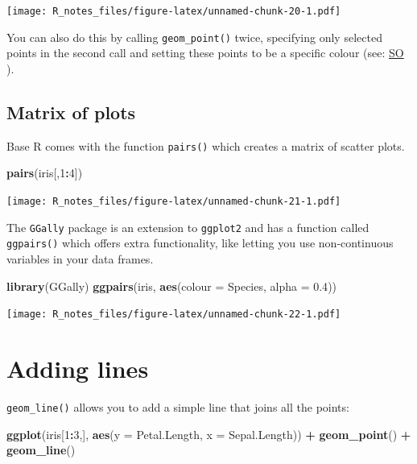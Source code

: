 \documentclass[]{book}
\newenvironment{Shaded}{\begin{snugshade}}{\end{snugshade}}
\newcommand{\KeywordTok}[1]{\textcolor[rgb]{0.13,0.29,0.53}{\textbf{#1}}}
\newcommand{\DataTypeTok}[1]{\textcolor[rgb]{0.13,0.29,0.53}{#1}}
\newcommand{\DecValTok}[1]{\textcolor[rgb]{0.00,0.00,0.81}{#1}}
\newcommand{\FloatTok}[1]{\textcolor[rgb]{0.00,0.00,0.81}{#1}}
\newcommand{\StringTok}[1]{\textcolor[rgb]{0.31,0.60,0.02}{#1}}
\newcommand{\OperatorTok}[1]{\textcolor[rgb]{0.81,0.36,0.00}{\textbf{#1}}}
\newcommand{\NormalTok}[1]{#1}
\begin{document}
\texttt{[image: R\_notes\_files/figure-latex/unnamed-chunk-20-1.pdf]}

You can also do this by calling \texttt{geom\_point()} twice, specifying
only selected points in the second call and setting these points to be a
specific colour (see:
\href{https://stackoverflow.com/questions/11467965/r-ggplot2-highlighting-selected-points-and-strange-behavior}{SO}
).

\subsection{Matrix of plots}\label{matrix-of-plots}

Base R comes with the function \texttt{pairs()} which creates a matrix
of scatter plots.

\begin{Shaded}
\begin{Highlighting}[]
\KeywordTok{pairs}\NormalTok{(iris[,}\DecValTok{1}\OperatorTok{:}\DecValTok{4}\NormalTok{])}
\end{Highlighting}
\end{Shaded}

\texttt{[image: R\_notes\_files/figure-latex/unnamed-chunk-21-1.pdf]}

The \texttt{GGally} package is an extension to \texttt{ggplot2} and has
a function called \texttt{ggpairs()} which offers extra functionality,
like letting you use non-continuous variables in your data frames.

\begin{Shaded}
\begin{Highlighting}[]
\KeywordTok{library}\NormalTok{(GGally)}
\KeywordTok{ggpairs}\NormalTok{(iris, }\KeywordTok{aes}\NormalTok{(}\DataTypeTok{colour =}\NormalTok{ Species, }\DataTypeTok{alpha =} \FloatTok{0.4}\NormalTok{))}
\end{Highlighting}
\end{Shaded}

\texttt{[image: R\_notes\_files/figure-latex/unnamed-chunk-22-1.pdf]}

\section{Adding lines}\label{adding-lines}

\texttt{geom\_line()} allows you to add a simple line that joins all the
points:

\begin{Shaded}
\begin{Highlighting}[]
\KeywordTok{ggplot}\NormalTok{(iris[}\DecValTok{1}\OperatorTok{:}\DecValTok{3}\NormalTok{,], }\KeywordTok{aes}\NormalTok{(}\DataTypeTok{y =}\NormalTok{ Petal.Length, }\DataTypeTok{x =}\NormalTok{ Sepal.Length)) }\OperatorTok{+}\StringTok{ }
\StringTok{  }\KeywordTok{geom_point}\NormalTok{() }\OperatorTok{+}\StringTok{ }
\StringTok{  }\KeywordTok{geom_line}\NormalTok{()}
\end{Highlighting}
\end{Shaded}
\end{document}
